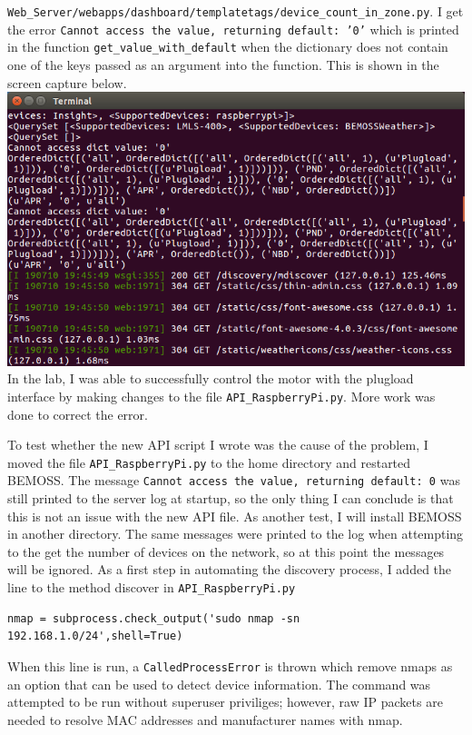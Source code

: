 \documentclass[fontsize=11pt, %
                             paper=letter, %
                             twoside, %
                             captions=tableheading,
                             index=totoc,
                             hyperref]{labbook}
\begin{document}
\begin{addmargin}[0cm]{0cm}
\texttt{Web\_Server/webapps/dashboard/templatetags/device\_count\_in\_zone.py}. I get the error \texttt{Cannot access the value, returning default: '0'} which is printed in the function \texttt{get\_value\_with\_default} when the dictionary does not contain one of the keys passed as an argument into the function. This is shown in the screen capture below.
\includegraphics[scale=0.5]{figs/orderedDictError.png} 
\bigbreak\noindent
In the lab, I was able to successfully control the motor with the plugload interface by making changes to the file \texttt{API\_RaspberryPi.py}. More work was done to correct the error.

To test whether the new API script I wrote was the cause of the problem, I moved the file \texttt{API\_RaspberryPi.py} to the home directory and restarted BEMOSS. The message \texttt{Cannot access the value, returning default: 0} was still printed to the server log at startup, so the only thing I can conclude is that this is not an issue with the new API file. As another test, I will install BEMOSS in another directory. The same messages were printed to the log when attempting to the get the number of devices on the network, so at this point the messages will be ignored.
\bigbreak\noindent
As a first step in automating the discovery process, I added the line to the method discover in \texttt{API\_RaspberryPi.py}
\begin{verbatim}
nmap = subprocess.check_output('sudo nmap -sn 192.168.1.0/24',shell=True)
\end{verbatim}
When this line is run, a \texttt{CalledProcessError} is thrown which remove nmaps as an option that can be used to detect device information. The command was attempted to be run without superuser priviliges; however, raw IP packets are needed to resolve MAC addresses and manufacturer names with nmap.


\end{addmargin}
\end{document}
